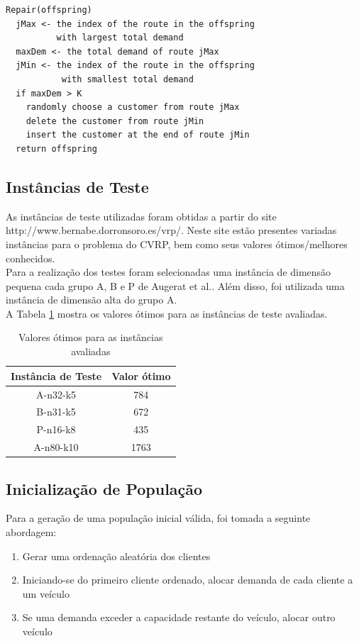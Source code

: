 \documentclass[conference]{IEEEtran}
\begin{document}
\begin{verbatim}
Repair(offspring)
  jMax <- the index of the route in the offspring 
          with largest total demand
  maxDem <- the total demand of route jMax 
  jMin <- the index of the route in the offspring
           with smallest total demand
  if maxDem > K
    randomly choose a customer from route jMax
    delete the customer from route jMin
    insert the customer at the end of route jMin
  return offspring
\end{verbatim}


\subsection{Instâncias de Teste}
As instâncias de teste utilizadas foram obtidas a partir do site http://www.bernabe.dorronsoro.es/vrp/. Neste site estão presentes variadas instâncias para o problema do CVRP, bem como seus valores ótimos/melhores conhecidos.\\
Para a realização dos testes foram selecionadas uma instância de dimensão pequena cada grupo A, B e P de Augerat et al.. Além disso, foi utilizada uma instância de dimensão alta do grupo A.\\
A Tabela \ref{table_optimum} mostra os valores ótimos para as instâncias de teste avaliadas.

\begin{table}[!t]
\renewcommand{\arraystretch}{1.3}
\caption{Valores ótimos para as instâncias avaliadas}
\label{table_optimum}
\centering
\begin{tabular}{|c||c|}
\hline
Instância de Teste & Valor ótimo\\
\hline
A-n32-k5 & 784\\
B-n31-k5 & 672\\
P-n16-k8 & 435\\
A-n80-k10 & 1763\\
\hline
\end{tabular}
\end{table}


\subsection{Inicialização de População}
Para a geração de uma população inicial válida, foi tomada a seguinte abordagem:
\begin{enumerate}
\item Gerar uma ordenação aleatória dos clientes
\item Iniciando-se do primeiro cliente ordenado, alocar demanda de cada cliente a um veículo
\item Se uma demanda exceder a capacidade restante do veículo, alocar outro veículo
\end{enumerate}
\end{document}
